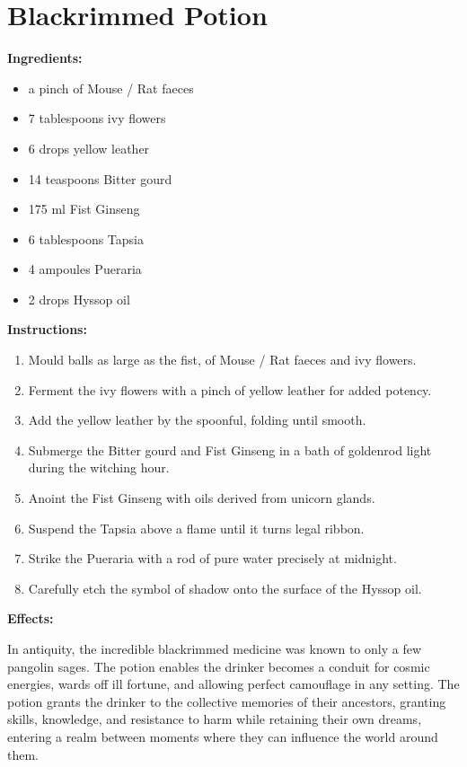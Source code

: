 \documentclass{article}
\begin{document}
\newpage
\section*{Blackrimmed Potion}

\textbf{Ingredients:}

\begin{itemize}
  \item a pinch of Mouse / Rat faeces
  \item 7 tablespoons ivy flowers
  \item 6 drops yellow leather
  \item 14 teaspoons Bitter gourd
  \item 175 ml Fist Ginseng
  \item 6 tablespoons Tapsia
  \item 4 ampoules Pueraria
  \item 2 drops Hyssop oil
\end{itemize}

\textbf{Instructions:}

\begin{enumerate}
  \item Mould balls as large as the fist, of Mouse / Rat faeces and ivy flowers.
  \item Ferment the ivy flowers with a pinch of yellow leather for added potency.
  \item Add the yellow leather by the spoonful, folding until smooth.
  \item Submerge the Bitter gourd and Fist Ginseng in a bath of goldenrod light during the witching hour.
  \item Anoint the Fist Ginseng with oils derived from unicorn glands.
  \item Suspend the Tapsia above a flame until it turns legal ribbon.
  \item Strike the Pueraria with a rod of pure water precisely at midnight.
  \item Carefully etch the symbol of shadow onto the surface of the Hyssop oil.
\end{enumerate}

\textbf{Effects:}

In antiquity, the incredible blackrimmed medicine was known to only a few pangolin sages. The potion enables the drinker becomes a conduit for cosmic energies, wards off ill fortune, and allowing perfect camouflage in any setting. The potion grants the drinker to the collective memories of their ancestors, granting skills, knowledge, and resistance to harm while retaining their own dreams, entering a realm between moments where they can influence the world around them.
\end{document}
